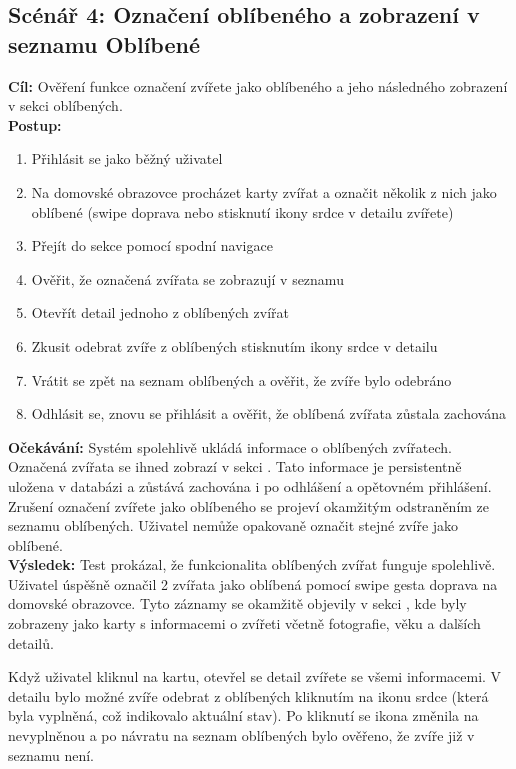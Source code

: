 \documentclass[czech, bp, kiv, he, iso690numb, pdf]{fasthesis}
\begin{document}
    \subsection*{Scénář 4: Označení oblíbeného a zobrazení v seznamu Oblíbené}

    \textbf{Cíl:} Ověření funkce označení zvířete jako oblíbeného a jeho následného zobrazení v sekci oblíbených.\\

    \noindent \textbf{Postup:}
    \begin{enumerate}
        \item Přihlásit se jako běžný uživatel
        \item Na domovské obrazovce procházet karty zvířat a označit několik z nich jako oblíbené (swipe doprava nebo stisknutí ikony srdce v detailu zvířete)
        \item Přejít do sekce  pomocí spodní navigace
        \item Ověřit, že označená zvířata se zobrazují v seznamu
        \item Otevřít detail jednoho z oblíbených zvířat
        \item Zkusit odebrat zvíře z oblíbených stisknutím ikony srdce v detailu
        \item Vrátit se zpět na seznam oblíbených a ověřit, že zvíře bylo odebráno
        \item Odhlásit se, znovu se přihlásit a ověřit, že oblíbená zvířata zůstala zachována
    \end{enumerate}

    \noindent \textbf{Očekávání:} Systém spolehlivě ukládá informace o oblíbených zvířatech. Označená zvířata se ihned zobrazí v sekci . Tato informace je persistentně uložena v databázi a zůstává zachována i po odhlášení a opětovném přihlášení. Zrušení označení zvířete jako oblíbeného se projeví okamžitým odstraněním ze seznamu oblíbených. Uživatel nemůže opakovaně označit stejné zvíře jako oblíbené.\\

    \noindent \textbf{Výsledek:}
    Test prokázal, že funkcionalita oblíbených zvířat funguje spolehlivě. Uživatel úspěšně označil 2 zvířata jako oblíbená pomocí swipe gesta doprava na domovské obrazovce. Tyto záznamy se okamžitě objevily v sekci , kde byly zobrazeny jako karty s informacemi o zvířeti včetně fotografie, věku a dalších detailů.

    Když uživatel kliknul na kartu, otevřel se detail zvířete se všemi informacemi. V detailu bylo možné zvíře odebrat z oblíbených kliknutím na ikonu srdce (která byla vyplněná, což indikovalo aktuální stav). Po kliknutí se ikona změnila na nevyplněnou a po návratu na seznam oblíbených bylo ověřeno, že zvíře již v seznamu není.
\end{document}
